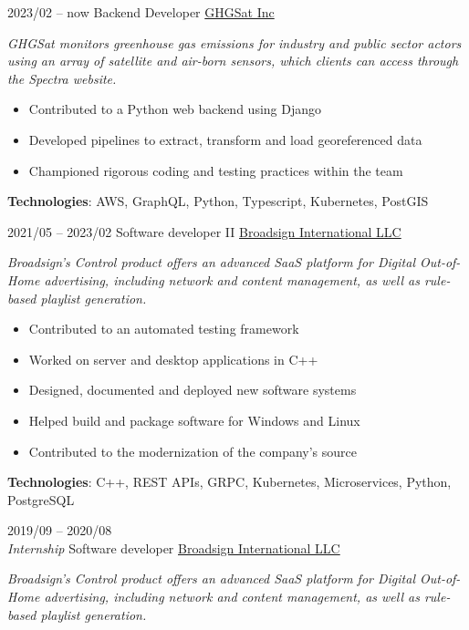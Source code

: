 \documentclass[9pt]{developercv2} %
\begin{document}
\begin{entrylist}
	\entry
	{2023/02 -- now}
	{Backend Developer}
	{\href{https://ghgsat.com/en/}{GHGSat Inc}}
	{
		\emph{
			GHGSat monitors greenhouse gas emissions for industry and public
			sector actors using an array of satellite and air-born sensors,
			which clients can access through the Spectra website.
		}

		\begin{itemize}
			\renewcommand{\labelitemi}{\raisebox{.45ex}{\rule{.6ex}{.6ex}}}
			\setlength\itemsep{-1pt}
			\item Contributed to a Python web backend using Django
			\item Developed pipelines to extract, transform and load georeferenced data
			\item Championed rigorous coding and testing practices within the team
		\end{itemize}

		\textbf{Technologies}: AWS, GraphQL, Python, Typescript, Kubernetes, PostGIS
	}
	\entry
	{2021/05 -- 2023/02}
	{Software developer II}
	{\href{https://broadsign.com/}{Broadsign International LLC}}
	{
		\emph{
			Broadsign's Control product offers an advanced SaaS platform for
			Digital Out-of-Home advertising, including network and content
			management, as well as rule-based playlist generation.
		}

		\begin{itemize}
			\renewcommand{\labelitemi}{\raisebox{.45ex}{\rule{.6ex}{.6ex}}}
			\setlength\itemsep{-1pt}
			\item Contributed to an automated testing framework
			\item Worked on server and desktop applications in C++
			\item Designed, documented and deployed new software systems
			\item Helped build and package software for Windows and Linux
			\item Contributed to the modernization of the company's source
		\end{itemize}

		\textbf{Technologies}: C++, REST APIs, GRPC, Kubernetes, Microservices, Python, PostgreSQL
	}
	\entry
	{2019/09 -- 2020/08\\{\small\emph{Internship}}}
	{Software developer}
	{\href{https://broadsign.com/}{Broadsign International LLC}}
	{
		\emph{
			Broadsign's Control product offers an advanced SaaS platform for
			Digital Out-of-Home advertising, including network and content
			management, as well as rule-based playlist generation.
		}

}
\end{entrylist}
\end{document}
